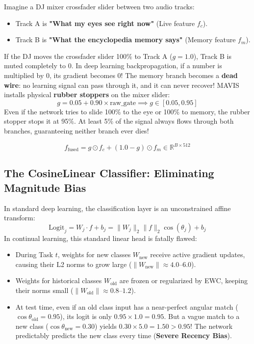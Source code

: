\documentclass[11pt,a4paper]{article}
\begin{document}
\begin{callout}
Imagine a DJ mixer crossfader slider between two audio tracks:
\begin{itemize}[noitemsep]
    \item Track A is \textbf{"What my eyes see right now"} (Live feature $f_c$).
    \item Track B is \textbf{"What the encyclopedia memory says"} (Memory feature $f_m$).
\end{itemize}
If the DJ moves the crossfader slider 100\% to Track A ($g=1.0$), Track B is muted completely to 0. In deep learning backpropagation, if a number is multiplied by 0, its gradient becomes 0! The memory branch becomes a \textbf{dead wire}: no learning signal can pass through it, and it can never recover!\newline
MAVIS installs physical \textbf{rubber stoppers} on the mixer slider:
\begin{equation}
g = 0.05 + 0.90 \times \text{raw\_gate} \implies g \in [0.05, 0.95]
\end{equation}
Even if the network tries to slide 100\% to the eye or 100\% to memory, the rubber stopper stops it at 95\%. At least 5\% of the signal always flows through both branches, guaranteeing neither branch ever dies!
\end{callout}

\begin{equation}
f_{\text{fused}} = g \odot f_c + (1.0 - g) \odot f_m \in \mathbb{R}^{B \times 512}
\end{equation}

\subsection{The CosineLinear Classifier: Eliminating Magnitude Bias}
In standard deep learning, the classification layer is an unconstrained affine transform:
\begin{equation}
\text{Logit}_j = W_j \cdot f + b_j = \|W_j\|_2 \|f\|_2 \cos(\theta_j) + b_j
\end{equation}
In continual learning, this standard linear head is fatally flawed:
\begin{itemize}[leftmargin=*]
    \item During Task $t$, weights for new classes $W_{\text{new}}$ receive active gradient updates, causing their L2 norms to grow large ($\|W_{\text{new}}\| \approx 4.0\text{--}6.0$).
    \item Weights for historical classes $W_{\text{old}}$ are frozen or regularized by EWC, keeping their norms small ($\|W_{\text{old}}\| \approx 0.8\text{--}1.2$).
    \item At test time, even if an old class input has a near-perfect angular match ($\cos\theta_{\text{old}} = 0.95$), its logit is only $0.95 \times 1.0 = 0.95$. But a vague match to a new class ($\cos\theta_{\text{new}} = 0.30$) yields $0.30 \times 5.0 = 1.50 > 0.95$! The network predictably predicts the new class every time (\textbf{Severe Recency Bias}).
\end{itemize}
\end{document}
